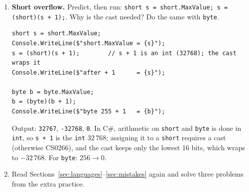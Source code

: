 \begin{enumerate}[label=\textbf{H\arabic*.},leftmargin=*,itemsep=1pt]
\begin{solbox}
\begin{lstlisting}[numbers=none]
int days = total / MinutesPerDay;
int hours = total % MinutesPerDay / 60;
int minutes = total % 60;
Console.WriteLine($"{total} min = {days} days {hours} h {minutes} min");
\end{lstlisting}
 Test: $100\,000$ min $\to$ \texttt{69 days 10 h 40 min} ($69 \cdot 1440 = 99\,360$; remaining $640$ min $= 10$ h $40$ min).
\end{solbox}\fi
  \item {} \textbf{Short overflow.} Predict, then run: \texttt{short s = short.MaxValue; s = (short)(s + 1);}. Why is the cast needed? Do the same with \texttt{byte}.
  \ifsolutions\begin{solbox}\begin{lstlisting}[numbers=none]
short s = short.MaxValue;
Console.WriteLine($"short.MaxValue = {s}");
s = (short)(s + 1);        // s + 1 is an int (32768); the cast wraps it
Console.WriteLine($"after + 1      = {s}");

byte b = byte.MaxValue;
b = (byte)(b + 1);
Console.WriteLine($"byte 255 + 1   = {b}");
\end{lstlisting}

Output: \texttt{32767}, \texttt{-32768}, \texttt{0}. In C\#, arithmetic on \texttt{short} and \texttt{byte} is done in \texttt{int}, so \texttt{s + 1} is the \texttt{int} $32\,768$; assigning it to a \texttt{short} requires a cast (otherwise CS0266), and the cast keeps only the lowest 16 bits, which wraps to $-32\,768$. For \texttt{byte}: $256 \to 0$.
\end{solbox}\fi
  \item Read Sections~\ref{sec:languages}--\ref{sec:mistakes} again and solve three problems from the extra practice.
\end{enumerate}

